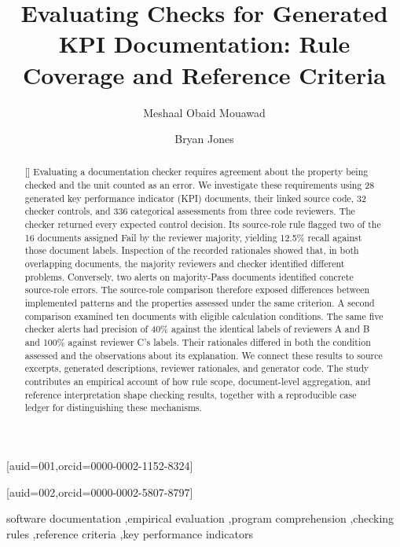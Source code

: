 \documentclass[a4paper,fleqn]{cas-dc}
\begin{document}
\let\WriteBookmarks\relax
\def\floatpagepagefraction{1}
\def\textpagefraction{.001}


\title[mode=title]{Evaluating Checks for Generated KPI Documentation: Rule Coverage and Reference Criteria}

\author[1]{Meshaal Obaid Mouawad}[auid=001,orcid=0000-0002-1152-8324]
\cormark[1]

\author[1]{Bryan Jones}[auid=002,orcid=0000-0002-5807-8797]


\begin{abstract}[]
Evaluating a documentation checker requires agreement about the property being checked and the unit counted as an error. We investigate these requirements using 28 generated key performance indicator (KPI) documents, their linked source code, 32 checker controls, and 336 categorical assessments from three code reviewers. The checker returned every expected control decision. Its source-role rule flagged two of the 16 documents assigned Fail by the reviewer majority, yielding 12.5\% recall against those document labels. Inspection of the recorded rationales showed that, in both overlapping documents, the majority reviewers and checker identified different problems. Conversely, two alerts on majority-Pass documents identified concrete source-role errors. The source-role comparison therefore exposed differences between implemented patterns and the properties assessed under the same criterion. A second comparison examined ten documents with eligible calculation conditions. The same five checker alerts had precision of 40\% against the identical labels of reviewers A and B and 100\% against reviewer C's labels. Their rationales differed in both the condition assessed and the observations about its explanation. We connect these results to source excerpts, generated descriptions, reviewer rationales, and generator code. The study contributes an empirical account of how rule scope, document-level aggregation, and reference interpretation shape checking results, together with a reproducible case ledger for distinguishing these mechanisms.
\end{abstract}
\begin{keywords}
software documentation \sep empirical evaluation \sep program comprehension \sep checking rules \sep reference criteria \sep key performance indicators
\end{keywords}
\maketitle
{}
\end{document}
